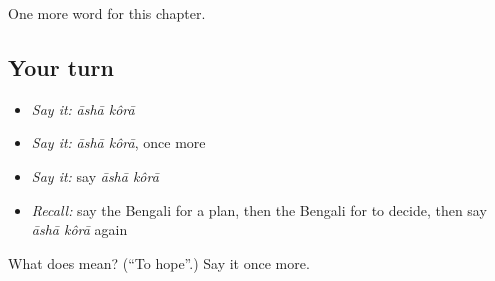 \begin{grammarlens}[title={What you've built}]
One more word for this chapter.
\end{grammarlens}

\subsection*{Your turn}
\begin{itemize}
\raggedright
  \item \emph{Say it:} \emph{āshā kôrā}
  \item \emph{Say it:} \emph{āshā kôrā}, once more
  \item \emph{Say it:} say \emph{āshā kôrā}
  \item \emph{Recall:} say the Bengali for a plan, then the Bengali for to decide, then say \emph{āshā kôrā} again
\end{itemize}

\begin{tcolorbox}[breakable,colback=teal!4,colframe=teal!35!black,title={Before you move on}]
What does   mean? (\textquotedblleft{}To hope\textquotedblright{}.) Say it once more.
\end{tcolorbox}
